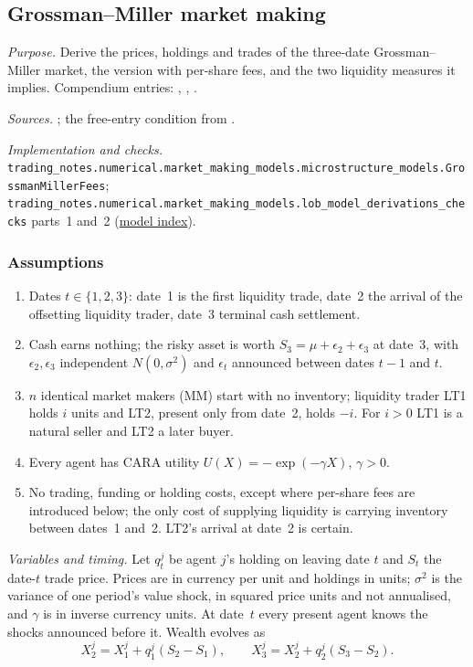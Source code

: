 \subsection{Grossman--Miller market making}\label{drv:grossman-miller}

\emph{Purpose.} Derive the prices, holdings and trades of the three-date Grossman--Miller market, the version with per-share fees, and the two liquidity measures it implies. Compendium entries: , , .

\emph{Sources.} \citep[chap.~``A Primer on the Microstructure of Financial Markets'', pp.~21--27]{crypto-cartea}; the free-entry condition from \citep[eqs.~(16)--(19), printed pp.~18--19]{grossman-miller-1988-nber}.

\emph{Implementation and checks.} \nolinkurl{trading_notes.numerical.market_making_models.microstructure_models.GrossmanMillerFees}; \nolinkurl{trading_notes.numerical.market_making_models.lob_model_derivations_checks} parts~1 and~2 (\hyperref[drv:model-index]{model index}).

\subsubsection{Assumptions}
\begin{enumerate}[label=\roman*.]
\setlength{\itemsep}{0pt}
\item Dates $t\in\{1,2,3\}$: date~1 is the first liquidity trade, date~2 the arrival of the offsetting liquidity trader, date~3 terminal cash settlement.
\item Cash earns nothing; the risky asset is worth $S_3=\mu+\epsilon_2+\epsilon_3$ at date~3, with $\epsilon_2,\epsilon_3$ independent $N(0,\sigma^2)$ and $\epsilon_t$ announced between dates $t-1$ and $t$.
\item $n$ identical market makers (MM) start with no inventory; liquidity trader LT1 holds $i$ units and LT2, present only from date~2, holds $-i$. For $i>0$ LT1 is a natural seller and LT2 a later buyer.
\item Every agent has CARA utility $U(X)=-\exp(-\gamma X)$, $\gamma>0$.
\item No trading, funding or holding costs, except where per-share fees are introduced below; the only cost of supplying liquidity is carrying inventory between dates~1 and~2. LT2's arrival at date~2 is certain.
\end{enumerate}
\emph{Variables and timing.} Let $q_t^j$ be agent $j$'s holding on leaving date $t$ and $S_t$ the date-$t$ trade price. Prices are in currency per unit and holdings in units; $\sigma^2$ is the variance of one period's value shock, in squared price units and not annualised, and $\gamma$ is in inverse currency units. At date~$t$ every present agent knows the shocks announced before it. Wealth evolves as
\[ X_2^j=X_1^j+q_1^j(S_2-S_1), \qquad X_3^j=X_2^j+q_2^j(S_3-S_2). \]

